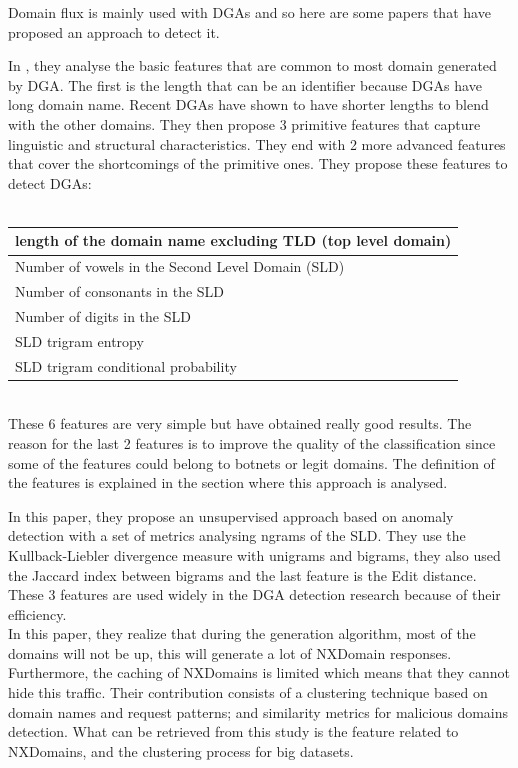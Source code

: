 Domain flux is mainly used with DGAs and so here are some papers that have proposed an approach to detect it.

In \cite{dga}, they analyse the basic features that are common to most domain generated by DGA. The first is the length that can be an identifier because DGAs have long domain name. Recent DGAs have shown to have shorter lengths to blend with the other domains. They then propose 3 primitive features that capture linguistic and structural characteristics. They end with 2 more advanced features that cover the shortcomings of the primitive ones. They propose these features to detect DGAs:\\\\
\begin{tabular}{|l|}
\hline
length of the domain name excluding TLD (top level domain)\\
\hline
Number of vowels in the Second Level Domain (SLD)\\
\hline
Number of consonants in the SLD\\
\hline
Number of digits in the SLD\\
\hline
SLD trigram entropy\\
\hline
SLD trigram conditional probability\\
\hline
\end{tabular}
\\

These 6 features are very simple but have obtained really good results. The reason for the last 2 features is to improve the quality of the classification since some of the features could belong to botnets or legit domains. The definition of the features is explained in the section where this approach is analysed.

In this paper\cite{dga3}, they propose an unsupervised approach based on anomaly detection with a set of metrics analysing ngrams of the SLD. They use the Kullback-Liebler divergence measure with unigrams and bigrams, they also used the Jaccard index between bigrams and the last feature is the Edit distance. These 3 features are used widely in the DGA detection research because of their efficiency. \\

In this paper\cite{dga4}, they realize that during the generation algorithm, most of the domains will not be up, this will generate a lot of NXDomain responses. Furthermore, the caching of NXDomains is limited which means that they cannot hide this traffic. Their contribution consists of a clustering technique based on domain names and request patterns; and similarity metrics for malicious domains detection. What can be retrieved from this study is the feature related to NXDomains, and the clustering process for big datasets.

